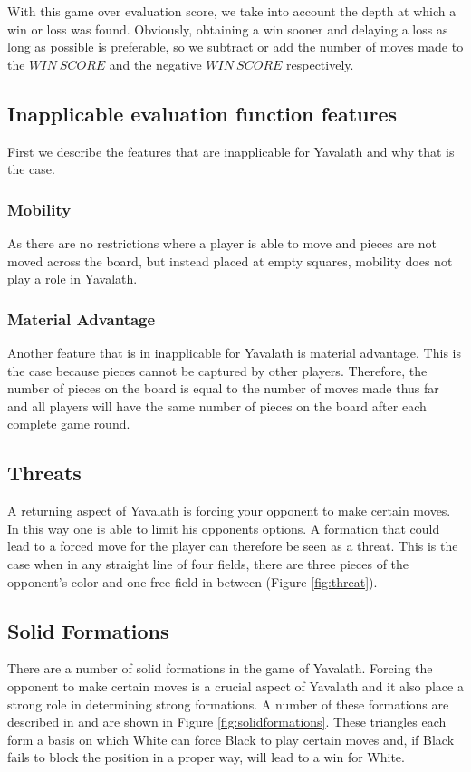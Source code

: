 \documentclass[11pt]{article}
\begin{document}
With this game over evaluation score, we take into account the depth at which a win or loss was found. Obviously, obtaining a win sooner and delaying a loss as long as possible is preferable, so we subtract or add the number of moves made to the $WIN\ SCORE$ and the negative $WIN\ SCORE$ respectively.

\subsection{Inapplicable evaluation function features}
\label{-subsec:inapplicableevaluationfunctionfeatures}
First we describe the features that are inapplicable for Yavalath and why that is the case.

\subsubsection{Mobility}
\label{-subsubsec:mobility}
As there are no restrictions where a player is able to move and pieces are not moved across the board, but instead placed at empty squares, mobility does not play a role in Yavalath.

\subsubsection{Material Advantage}
\label{-subsubsec:materialadvantage}
Another feature that is in inapplicable for Yavalath is material advantage. This is the case because pieces cannot be captured by other players. Therefore, the number of pieces on the board is equal to the number of moves made thus far and all players will have the same number of pieces on the board after each complete game round.

\subsection{Threats}
\label{-subsec:threats}
A returning aspect of Yavalath is forcing your opponent to make certain moves. In this way one is able to limit his opponents options. A formation that could lead to a forced move for the player can therefore be seen as a threat. This is the case when in any straight line of four fields, there are three pieces of the opponent's color and one free field in between (Figure \ref{fig:threat}).





\subsection{Solid Formations}
\label{-subsec:solidformations}
There are a number of solid formations in the game of Yavalath. Forcing the opponent to make certain moves is a crucial aspect of Yavalath and it also place a strong role in determining strong formations. A number of these formations are described in \cite{browne2011evolutionary} and are shown in Figure \ref{fig:solidformations}. These triangles each form a basis on which White can force Black to play certain moves and, if Black fails to block the position in a proper way, will lead to a win for White.
\end{document}

